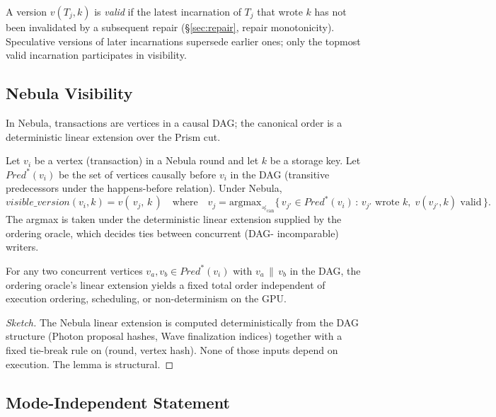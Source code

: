 A version $v(T_j, k)$ is \emph{valid} if the latest incarnation of
$T_j$ that wrote $k$ has not been invalidated by a subsequent repair
(\S\ref{sec:repair}, repair monotonicity). Speculative versions of
later incarnations supersede earlier ones; only the topmost valid
incarnation participates in visibility.

\subsection{Nebula Visibility}

In Nebula, transactions are vertices in a causal DAG; the canonical
order is a deterministic linear extension over the Prism cut.

\begin{definition}
\label{def:visible-nebula}
Let $v_i$ be a vertex (transaction) in a Nebula round and let $k$ be
a storage key. Let
$\mathit{Pred}^*(v_i)$ be the set of vertices causally before $v_i$ in
the DAG (transitive predecessors under the happens-before relation).
Under Nebula,
\[
\mathit{visible\_version}(v_i, k) =
v(\,v_j,\, k\,) \quad \text{where} \quad
v_j = \mathrm{argmax}_{\preceq_{\mathrm{can}}}
      \bigl\{\, v_{j'} \in \mathit{Pred}^*(v_i)\,:\,
      v_{j'} \text{ wrote } k,\;
      v(v_{j'},k) \text{ valid} \,\bigr\}.
\]
The argmax is taken under the deterministic linear extension supplied
by the ordering oracle, which decides ties between concurrent (DAG-
incomparable) writers.
\end{definition}

\begin{lemma}
\label{lem:tie-determinism}
For any two concurrent vertices $v_a, v_b \in \mathit{Pred}^*(v_i)$
with $v_a \,\|\, v_b$ in the DAG, the ordering oracle's linear
extension yields a fixed total order independent of execution
ordering, scheduling, or non-determinism on the GPU.
\end{lemma}

\begin{proof}[Sketch]
The Nebula linear extension is computed deterministically from the
DAG structure (Photon proposal hashes, Wave finalization indices)
together with a fixed tie-break rule on \textsf{(round, vertex hash)}.
None of those inputs depend on execution. The lemma is structural.
\end{proof}

\subsection{Mode-Independent Statement}

